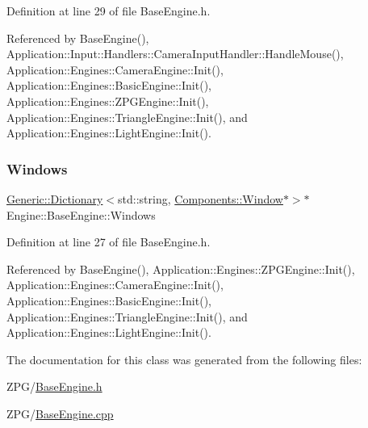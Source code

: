 Definition at line 29 of file Base\+Engine.\+h.



Referenced by Base\+Engine(), Application\+::\+Input\+::\+Handlers\+::\+Camera\+Input\+Handler\+::\+Handle\+Mouse(), Application\+::\+Engines\+::\+Camera\+Engine\+::\+Init(), Application\+::\+Engines\+::\+Basic\+Engine\+::\+Init(), Application\+::\+Engines\+::\+Z\+P\+G\+Engine\+::\+Init(), Application\+::\+Engines\+::\+Triangle\+Engine\+::\+Init(), and Application\+::\+Engines\+::\+Light\+Engine\+::\+Init().

\mbox{\label{classEngine_1_1BaseEngine_a4a1a4c4dae052e66ecc4f326eeed4d33}} 
\subsubsection{\texorpdfstring{Windows}{Windows}}
{\footnotesize\ttfamily \mbox{\hyperlink{classGeneric_1_1Dictionary}{Generic\+::\+Dictionary}}$<$std\+::string, \mbox{\hyperlink{classEngine_1_1Components_1_1Window}{Components\+::\+Window}}$\ast$$>$$\ast$ Engine\+::\+Base\+Engine\+::\+Windows}



Definition at line 27 of file Base\+Engine.\+h.



Referenced by Base\+Engine(), Application\+::\+Engines\+::\+Z\+P\+G\+Engine\+::\+Init(), Application\+::\+Engines\+::\+Camera\+Engine\+::\+Init(), Application\+::\+Engines\+::\+Basic\+Engine\+::\+Init(), Application\+::\+Engines\+::\+Triangle\+Engine\+::\+Init(), and Application\+::\+Engines\+::\+Light\+Engine\+::\+Init().



The documentation for this class was generated from the following files\+:\begin{DoxyCompactItemize}
\item 
Z\+P\+G/\mbox{\hyperlink{BaseEngine_8h}{Base\+Engine.\+h}}\item 
Z\+P\+G/\mbox{\hyperlink{BaseEngine_8cpp}{Base\+Engine.\+cpp}}\end{DoxyCompactItemize}
